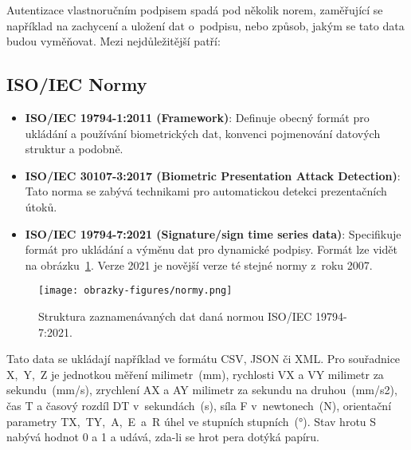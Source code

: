 Autentizace vlastnoručním podpisem spadá pod několik norem, zaměřující se například na zachycení a uložení dat o~podpisu, nebo způsob, jakým se tato data budou vyměňovat. 
Mezi nejdůležitější patří:

\subsection*{ISO/IEC Normy}
\begin{itemize}
  \item \textbf{ISO/IEC 19794-1:2011 (Framework)}: 
  Definuje obecný formát pro ukládání a používání biometrických dat, konvenci pojmenování datových struktur a podobně.\cite{iso19794-1_2011} %

  \item \textbf{ISO/IEC 30107-3:2017 (Biometric Presentation Attack Detection)}: 
  Tato norma se zabývá technikami pro automatickou detekci prezentačních útoků.~\cite{ISO/IEC30107-3_2017} %

  \item \textbf{ISO/IEC 19794-7:2021 (Signature/sign time series data)}:
  Specifikuje formát pro ukládání a výměnu dat pro dynamické podpisy. 
  Formát lze vidět na obrázku~\ref{fig:norms_table}. 
  Verze 2021 je novější verze té stejné normy z~roku 2007.~\cite{ISOIEC19794-7_2021} %
\end{itemize}

\begin{figure}[H]
  \centering
  \texttt{[image: obrazky-figures/normy.png]}
  \caption{Struktura zaznamenávaných dat daná normou ISO/IEC 19794-7:2021.~\cite{DSM2021}} %
  \label{fig:norms_table}
\end{figure}

Tato data se ukládají například ve formátu CSV, JSON či XML. 
Pro souřadnice X,~Y,~Z je jednotkou měření milimetr~(mm), rychlosti VX a VY milimetr za sekundu~(mm/s), 
zrychlení AX a AY milimetr za sekundu na druhou~(mm/s2), čas T a časový rozdíl DT v~sekundách~(s), síla F v~newtonech~(N), 
orientační parametry TX,~TY,~A,~E~a~R úhel ve stupních stupních~(°).
Stav hrotu S nabývá hodnot 0 a 1 a udává, zda-li se hrot pera dotýká papíru.~\cite{ISOIEC19794-7_2021}

